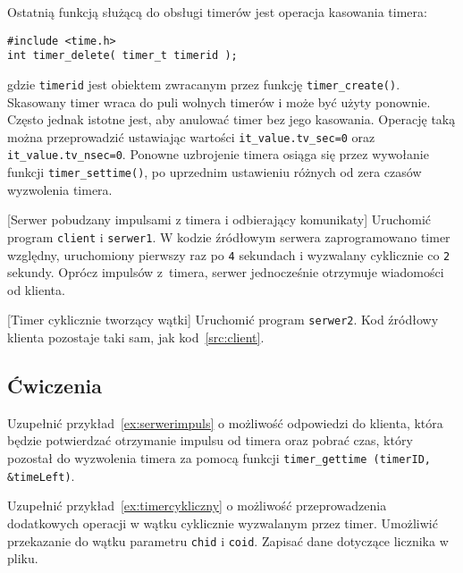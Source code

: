 Ostatnią funkcją służącą do obsługi timerów jest operacja kasowania timera:

\begin{lstlisting}[style=MyCStyle]
#include <time.h>
int timer_delete( timer_t timerid );
\end{lstlisting}

gdzie \lstinline[style=MyCStyle]{timerid} jest obiektem zwracanym przez funkcję \lstinline[style=MyCStyle]{timer_create()}.  Skasowany timer wraca do puli wolnych timerów i może być użyty ponownie. Często jednak istotne jest, aby anulować timer bez jego kasowania. Operację taką można przeprowadzić ustawiając wartości \lstinline[style=MyCStyle]{it_value.tv_sec=0} oraz \lstinline[style=MyCStyle]{it_value.tv_nsec=0}. Ponowne uzbrojenie timera osiąga się przez wywołanie funkcji \lstinline[style=MyCStyle]{timer_settime()}, po uprzednim ustawieniu różnych od zera czasów wyzwolenia timera.


\begin{example}{[Serwer pobudzany impulsami z timera i odbierający komunikaty]} Uruchomić program \lstinline[style=MyCStyle]{client} i \lstinline[style=MyCStyle]{serwer1}. W kodzie źródłowym serwera zaprogramowano timer względny, uruchomiony pierwszy raz po \lstinline[style=MyCStyle]{4} sekundach i wyzwalany cyklicznie co \lstinline[style=MyCStyle]{2} sekundy. Oprócz impulsów z~timera, serwer jednocześnie otrzymuje wiadomości od klienta.


\label{ex:serwerimpuls}
\end{example}

\begin{example}{[Timer cyklicznie tworzący wątki]} Uruchomić program \lstinline[style=MyCStyle]{serwer2}. Kod źródłowy klienta pozostaje taki sam, jak kod~\ref{src:client}.

\label{ex:timercykliczny}
\end{example}


\subsection{Ćwiczenia}

\begin{myenumerate}
\item Uzupełnić przykład~\ref{ex:serwerimpuls} o możliwość odpowiedzi do klienta, która będzie potwierdzać otrzymanie impulsu od timera oraz pobrać czas, który pozostał do wyzwolenia timera za pomocą funkcji \lstinline[style=MyCStyle]{timer_gettime (timerID, &timeLeft)}.
\item Uzupełnić przykład~\ref{ex:timercykliczny} o możliwość przeprowadzenia dodatkowych operacji w wątku cyklicznie wyzwalanym przez timer. Umożliwić przekazanie do wątku parametru \lstinline[style=MyCStyle]{chid} i \lstinline[style=MyCStyle]{coid}. Zapisać dane dotyczące licznika w pliku.
\end{myenumerate}

\cleardoublepage
